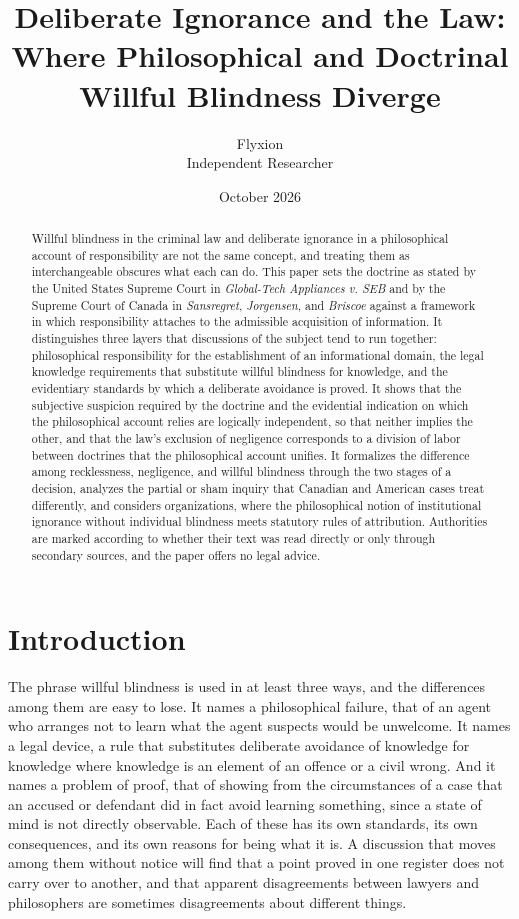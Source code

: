 \documentclass[11pt]{article}
\title{Deliberate Ignorance and the Law:\\Where Philosophical and Doctrinal Willful Blindness Diverge}
\author{Flyxion\\Independent Researcher}
\date{October 2026}
\theoremstyle{plain}
\theoremstyle{definition}
\begin{document}
\maketitle

\begin{abstract}
\noindent Willful blindness in the criminal law and deliberate ignorance in a philosophical account of responsibility are not the same concept, and treating them as interchangeable obscures what each can do. This paper sets the doctrine as stated by the United States Supreme Court in \emph{Global-Tech Appliances v. SEB} and by the Supreme Court of Canada in \emph{Sansregret}, \emph{Jorgensen}, and \emph{Briscoe} against a framework in which responsibility attaches to the admissible acquisition of information. It distinguishes three layers that discussions of the subject tend to run together: philosophical responsibility for the establishment of an informational domain, the legal knowledge requirements that substitute willful blindness for knowledge, and the evidentiary standards by which a deliberate avoidance is proved. It shows that the subjective suspicion required by the doctrine and the evidential indication on which the philosophical account relies are logically independent, so that neither implies the other, and that the law's exclusion of negligence corresponds to a division of labor between doctrines that the philosophical account unifies. It formalizes the difference among recklessness, negligence, and willful blindness through the two stages of a decision, analyzes the partial or sham inquiry that Canadian and American cases treat differently, and considers organizations, where the philosophical notion of institutional ignorance without individual blindness meets statutory rules of attribution. Authorities are marked according to whether their text was read directly or only through secondary sources, and the paper offers no legal advice.
\end{abstract}

\section{Introduction}

The phrase willful blindness is used in at least three ways, and the differences among them are easy to lose. It names a philosophical failure, that of an agent who arranges not to learn what the agent suspects would be unwelcome. It names a legal device, a rule that substitutes deliberate avoidance of knowledge for knowledge where knowledge is an element of an offence or a civil wrong. And it names a problem of proof, that of showing from the circumstances of a case that an accused or defendant did in fact avoid learning something, since a state of mind is not directly observable. Each of these has its own standards, its own consequences, and its own reasons for being what it is. A discussion that moves among them without notice will find that a point proved in one register does not carry over to another, and that apparent disagreements between lawyers and philosophers are sometimes disagreements about different things.
\end{document}
